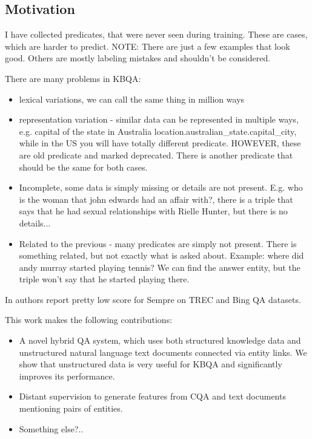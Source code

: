 

\subsection{Motivation}

I have collected predicates, that were never seen during training.
These are cases, which are harder to predict. NOTE: There are just a few examples that look good. Others are mostly labeling mistakes and shouldn't be considered.

There are many problems in KBQA:
\begin{itemize}
\item lexical variations, we can call the same thing in million ways
\item representation variation - similar data can be represented in multiple ways, e.g. capital of the state in Australia location.australian\_state.capital\_city, while in the US you will have totally different predicate. HOWEVER, these are old predicate and marked deprecated. There is another predicate that should be the same for both cases.
\item Incomplete, some data is simply missing or details are not present. E.g. who is the woman that john edwards had an affair with?, there is a triple that says that he had sexual relationships with Rielle Hunter, but there is no details...
\item Related to the previous - many predicates are simply not present. There is something related, but not exactly what is asked about. Example: where did andy murray started playing tennis? We can find the answer entity, but the triple won't say that he started playing there.
\end{itemize}

In \cite{Sun:2015:ODQ:2736277.2741651} authors report pretty low score for Sempre on TREC and Bing QA datasets.

This work makes the following contributions:
\begin{itemize}
\item A novel hybrid QA system, which uses both structured knowledge data and unstructured natural language text documents connected via entity links. We show that unstructured data is very useful for KBQA and significantly improves its performance.
\item Distant supervision to generate features from CQA and text documents mentioning pairs of entities.
\item Something else?..
\end{itemize}

